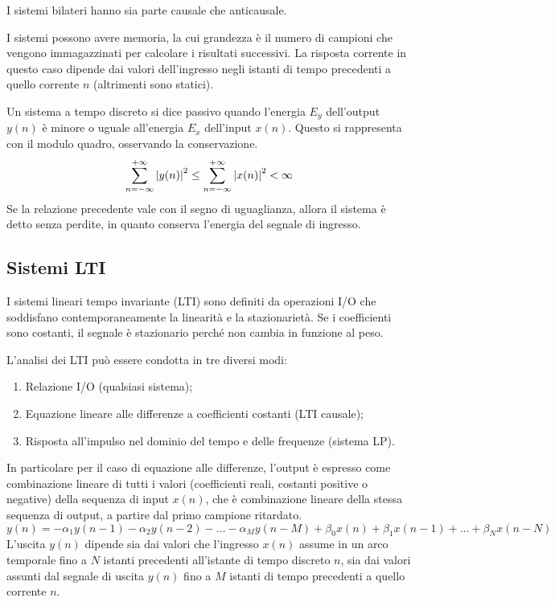 I sistemi bilateri hanno sia parte causale che anticausale.

I sistemi possono avere memoria, la cui grandezza è il numero di campioni che vengono immagazzinati per calcolare i risultati successivi. La risposta corrente in questo caso dipende dai valori dell'ingresso negli istanti di tempo precedenti a quello corrente $n$ (altrimenti sono statici).

Un sistema a tempo discreto si dice passivo quando l'energia $E_y$ dell'output $y(n)$ è minore o uguale all'energia $E_x$ dell'input $x(n)$. Questo si rappresenta con il modulo quadro, osservando la conservazione. 
$$\sum_{n=-\infty}^{+\infty}\left|y(n)\right|^2 \leq \sum_{n=-\infty}^{+\infty}\left|x(n)\right|^2 < \infty$$
Se la relazione precedente vale con il segno di uguaglianza, allora il sistema è detto senza perdite, in quanto conserva l'energia del segnale di ingresso.

\subsection{Sistemi LTI}
I sistemi lineari tempo invariante (LTI) sono definiti da operazioni I/O che soddisfano contemporaneamente la linearità e la stazionarietà. Se i coefficienti sono costanti, il segnale è stazionario perché non cambia in funzione al peso.

L'analisi dei LTI può essere condotta in tre diversi modi:
\begin{enumerate}
	\item Relazione I/O (qualsiasi sistema);
	\item Equazione lineare alle differenze a coefficienti costanti (LTI causale);
	\item Risposta all'impulso nel dominio del tempo e delle frequenze (sistema LP).
\end{enumerate}

In particolare per il caso di equazione alle differenze, l'output è espresso come combinazione lineare di tutti i valori (coefficienti reali, costanti positive o negative) della sequenza di input $x(n)$, che è combinazione lineare della stessa sequenza di output, a partire dal primo campione ritardato. 
$$y(n) = -\alpha_1y(n-1) - \alpha_2y(n - 2) - \dots - \alpha_My(n - M) + \beta_0x(n) + \beta_1x(n - 1) + \dots + \beta_Nx(n - N)$$
L'uscita $y(n)$ dipende sia dai valori che l'ingresso $x(n)$ assume in un arco temporale fino a $N$ istanti precedenti all'istante di tempo discreto $n$, sia dai valori assunti dal segnale di uscita $y(n)$ fino a $M$ istanti di tempo precedenti a quello corrente $n$.


